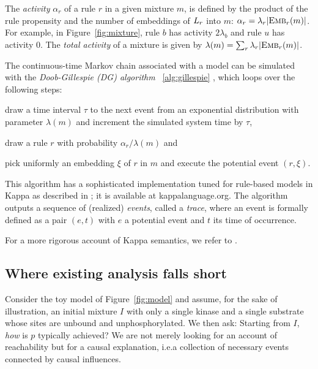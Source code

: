 The \emph{activity} $\alpha_r$ of a rule $r$ in a given mixture $m$, is defined by the product of the rule propensity and the number of embeddings of $L_{r}$ into $m$: $\alpha_r=\lambda_r|{\textsc{Emb}}_{r}(m)|$. For example, in Figure~\ref{fig:mixture}, rule $b$ has activity $2\lambda_b$ and rule $u$ has activity $0$. The \emph{total activity} of a mixture is given by $\lambda(m)=\sum_r\lambda_r|{\textsc{Emb}}_{r}(m)|$.

The continuous-time Markov chain associated with a model can be simulated with the \emph{Doob-Gillespie (DG) algorithm} ~\ref{alg:gillespie} \cite{}, which loops over the following steps:
\begin{inparaenum}[(1)]
\item 
draw a time interval $\tau$ to the next event from an exponential distribution with parameter $\lambda(m)$ and increment the simulated system time by $\tau$,
\item 
draw a rule $r$ with probability $\alpha_r/\lambda(m)$ and
\item 
pick uniformly an embedding $\xi$ of $r$ in $m$ and execute the potential event $(r, \xi)$.
\end{inparaenum}
This algorithm has a sophisticated implementation tuned for rule-based models in Kappa as described in \cite{DanosEtAl-APLAS07,BoutillierEK17}; it is available at kappalanguage.org. The algorithm outputs a sequence of (realized) \emph{events}, called a \emph{trace}, where an event is formally defined as a pair $(e, t)$ with $e$ a potential event and $t$ its time of occurrence.



\noindent For a more rigorous account of Kappa semantics, we refer to \cite{}.

\subsection{Where existing analysis falls short}


Consider the toy model of Figure~\ref{fig:model} and assume, for the sake of illustration, an initial mixture $I$ with only a single kinase and a single substrate whose sites are unbound and unphosphorylated. We then ask: Starting from $I$, \emph{how} is $p$ typically achieved? We are not merely looking for an account of reachability but for a causal explanation, i.e.\@ a collection of necessary events connected by causal influences.

